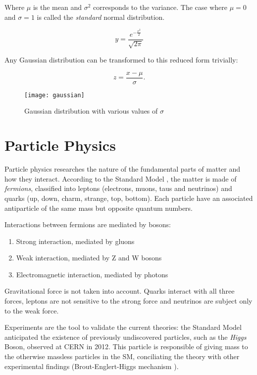 Where $\mu$ is the mean and $\sigma ^2$ corresponds to the variance. The case where $\mu = 0$ and $\sigma = 1$ is called the \textit{standard} normal distribution.

\begin{equation}
	y = \frac{e^{ - \frac{{x^2 }}{2}}}{{\sqrt {2\pi } }}
\end{equation}

Any Gaussian distribution can be transformed to this reduced form trivially:

\begin{equation}
	z = \frac{x-\mu}{\sigma}.
\end{equation}

\begin{figure}
	\centerline{
		\texttt{[image: gaussian]}}
	\caption{Gaussian distribution with various values of $\sigma$ \cite{leo2012techniques}}
\end{figure}

\section{Particle Physics}

Particle physics researches the nature of the fundamental parts of matter and how they interact. According to the Standard Model \cite{Quang:1998yw}, the matter is made of \textit{fermions}, classified into leptons (electrons, muons, taus and neutrinos) and quarks (up, down, charm, strange, top, bottom). Each particle have an associated antiparticle of the same mass but opposite quantum numbers.

Interactions between fermions are mediated by bosons:

\begin{enumerate}
	\item Strong interaction, mediated by gluons
	\item Weak interaction, mediated by Z and W bosons
	\item Electromagnetic interaction, mediated by photons
\end{enumerate}

Gravitational force is not taken into account. Quarks interact with all three forces, leptons are not sensitive to the strong force and neutrinos are subject only to the weak force.

Experiments are the tool to validate the current theories: the Standard Model anticipated the existence of previously undiscovered particles, such as the \textit{Higgs} Boson, observed at CERN in 2012. This particle is responsible of giving mass to the otherwise massless particles in the SM, conciliating the theory with other experimental findings (Brout-Englert-Higgs mechanism \cite{PhysRevLett.13.321, PhysRevLett.13.508}).

